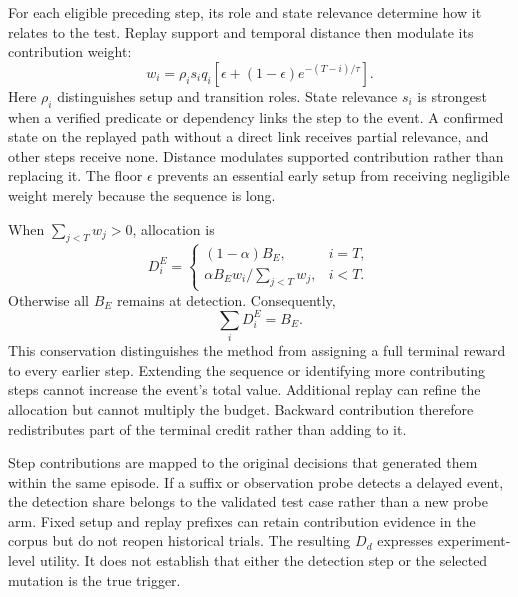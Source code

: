 \documentclass[10pt,journal,compsoc]{IEEEtran}
\begin{document}
For each eligible preceding step, its role and state relevance determine how it relates to the test. Replay support and temporal distance then modulate its contribution weight:
\begin{equation}
w_i=\rho_i s_i q_i
     \left[\epsilon+(1-\epsilon)e^{-(T-i)/\tau}\right].
\label{eq:credit-weight}
\end{equation}
Here $\rho_i$ distinguishes setup and transition roles. State relevance $s_i$ is strongest when a verified predicate or dependency links the step to the event. A confirmed state on the replayed path without a direct link receives partial relevance, and other steps receive none. Distance modulates supported contribution rather than replacing it. The floor $\epsilon$ prevents an essential early setup from receiving negligible weight merely because the sequence is long.

When $\sum_{j<T}w_j>0$, allocation is
\begin{equation}
D_i^E=
\begin{cases}
(1-\alpha)B_E, & i=T,\\
\alpha B_Ew_i/\sum_{j<T}w_j, & i<T.
\end{cases}
\label{eq:allocation}
\end{equation}
Otherwise all $B_E$ remains at detection. Consequently,
\begin{equation}
\sum_i D_i^E=B_E.
\label{eq:budget}
\end{equation}
This conservation distinguishes the method from assigning a full terminal reward to every earlier step. Extending the sequence or identifying more contributing steps cannot increase the event's total value. Additional replay can refine the allocation but cannot multiply the budget. Backward contribution therefore redistributes part of the terminal credit rather than adding to it.

Step contributions are mapped to the original decisions that generated them within the same episode. If a suffix or observation probe detects a delayed event, the detection share belongs to the validated test case rather than a new probe arm. Fixed setup and replay prefixes can retain contribution evidence in the corpus but do not reopen historical trials. The resulting $D_d$ expresses experiment-level utility. It does not establish that either the detection step or the selected mutation is the true trigger.
\end{document}
